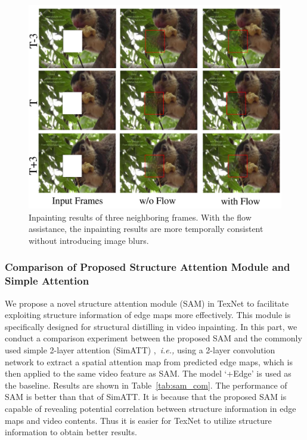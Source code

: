 \begin{figure}[t]
	\centering
	\includegraphics[width=0.9\columnwidth]{flow_vis} %
	\caption{Inpainting results of three neighboring frames. With the flow assistance, the inpainting results are more temporally consistent without introducing image blurs. }
	\label{flow_vis}
\end{figure}




\subsubsection{Comparison of Proposed Structure Attention Module and Simple Attention}

We propose a novel structure attention module (SAM) in TexNet to facilitate exploiting structure information of edge maps more effectively. This module is specifically designed for structural distilling in video inpainting. In this part, we conduct a comparison experiment between the proposed SAM and the commonly used simple 2-layer attention (SimATT) \cite{min2019two},~\emph{i.e.,} using a 2-layer convolution network to extract a spatial attention map from predicted edge maps, which is then applied to the same video feature as SAM. 
The model `+Edge' is used as the baseline.
Results are shown in Table~\ref{tab:sam_com}.
The performance of SAM is better than that of SimATT. It is because that the proposed SAM is capable of revealing potential correlation between structure information in edge maps and video contents.
Thus it is easier for TexNet to utilize structure information to obtain better results.



